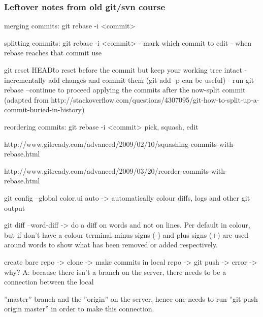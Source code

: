 \documentclass{git_course}
\begin{document}
\begin{frame}
\frametitle{Leftover notes from old git/svn course}
merging commits: git rebase -i <commit>

splitting commits: git rebase -i <commit> - mark which commit
to edit - when rebase reaches that commit use

git reset HEAD\^ to reset before the commit but keep your
working tree intact - incrementally add changes and commit
them (git add -p can be useful) - run git rebase –continue to
proceed applying the commits after the now-split commit
(adapted from
http://stackoverflow.com/questions/4307095/git-how-to-split-up-a-commit-buried-in-history)

reordering commits: git rebase -i <commit>
pick, squash, edit

http://www.gitready.com/advanced/2009/02/10/squashing-commits-with-rebase.html

http://www.gitready.com/advanced/2009/03/20/reorder-commits-with-rebase.html

git config --global color.ui auto -> automatically colour diffs,
logs and other git output

git diff --word-diff -> do a diff on words and not on lines. Per
default in colour, but if don’t have a colour terminal minus
signs (-) and plus signs (+) are used around words to show
what has been removed or added respectively.

create bare repo -> clone -> make commits in local repo -> git
push -> error -> why? A: because there isn’t a branch on the
server, there needs to be a connection between the local

”master” branch and the ”origin” on the server, hence one
needs to run ”git push origin master” in order to make this
connection.
\end{frame}


\end{document}
